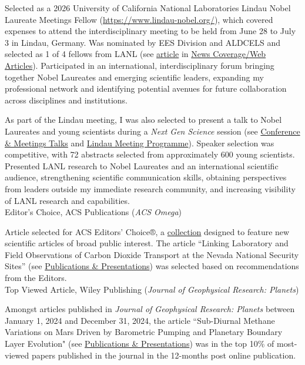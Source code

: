 \documentclass[11pt, letterpaper]{article}
\newcommand{\years}[1]{\marginnote{\scriptsize #1}}
\begin{document}
Selected as a 2026 University of California National Laboratories 
Lindau Nobel Laureate Meetings Fellow
(\href{https://www.lindau-nobel.org/}{https://www.lindau-nobel.org/}), which
covered expenses to attend the interdisciplinary meeting to be held from June 28
to July 3 in Lindau, Germany. Was nominated by EES Division and ALDCELS and
selected as 1 of 4 fellows from LANL (see
\href{https://www.lanl.gov/media/newsletters/ste-highlights/04-2026-lindau-meeting}{article}
in \hyperref[sec:news]{News Coverage/Web Articles}). Participated in an
international, interdisciplinary forum bringing together Nobel Laureates and
emerging scientific leaders, expanding my professional network and identifying
potential avenues for future collaboration across disciplines and institutions.

As part of the Lindau meeting, I was also selected to present a talk to Nobel
Laureates and young scientists during a \textit{Next Gen Science} session
(see \hyperref[sec:conference-talks]{Conference \& Meetings Talks} and
    \href{https://www.mediatheque.lindau-nobel.org/meetings/2026/programme/42971}{Lindau
Meeting Programme}). Speaker selection was competitive, with 72 abstracts
selected from approximately 600 young scientists. Presented LANL research to
Nobel Laureates and an international scientific audience, strengthening
scientific communication skills, obtaining perspectives from leaders outside my
immediate research community, and increasing visibility of LANL research and
capabilities.
\\

\years{2026}Editor's Choice, ACS Publications (\emph{ACS Omega})

Article selected for ACS Editors' Choice®, a \href{https://pubs.acs.org/page/policy/editorchoice/index.html}{collection} designed to feature
new scientific articles of broad public interest.  The article ``Linking Laboratory
and Field Observations of Carbon Dioxide Transport at the Nevada National
Security Sites'' 
(see \hyperref[sec:pubs]{Publications \& Presentations}) was
selected based on recommendations from the Editors.\\


\years{2026}Top Viewed Article, Wiley Publishing (\emph{Journal of Geophysical Research: Planets})

Amongst articles published in \emph{Journal of Geophysical Research: Planets}
between January 1, 2024 and December 31, 2024, the article ``Sub-Diurnal
Methane Variations on Mars Driven by Barometric Pumping and Planetary Boundary
Layer Evolution" (see \hyperref[sec:pubs]{Publications \& Presentations}) was
in the top 10\% of most-viewed papers published in the journal in the 12-months
post online publication.\\
\end{document}
